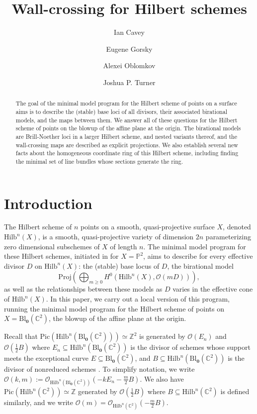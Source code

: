 \documentclass[12pt]{amsart}
\title{Wall-crossing for Hilbert schemes}
\author{Ian Cavey}
\author{Eugene Gorsky}
\author{Alexei Oblomkov}
\author{Joshua P. Turner}
\newcommand{\Hilb}{\mathrm{Hilb}}
\newcommand{\C}{\mathbb{C}}
\newcommand{\Z}{\mathbb{Z}}
\renewcommand{\P}{\mathbb{P}}
\newcommand{\CO}{\mathcal{O}}
\newcommand{\Pic}{\mathrm{Pic}}
\newcommand{\Proj}{\mathrm{Proj}}
\newcommand{\Bl}{\mathrm{Bl}}
\numberwithin{equation}{section}
\theoremstyle{definition}
\begin{document}
\maketitle

\begin{abstract}
    The goal of the minimal model program for the Hilbert scheme of points on a surface aims is to describe the (stable) base loci of all divisors, their associated birational models, and the maps between them. We answer all of these questions for the Hilbert scheme of points on the blowup of the affine plane at the origin. The birational models are Brill-Noether loci in a larger Hilbert scheme, and nested variants thereof, and the wall-crossing maps are described as explicit projections. We also establish several new facts about the homogeneous coordinate ring of this Hilbert scheme, including finding the minimal set of line bundles whose sections generate the ring.
\end{abstract}

\section{Introduction}

The Hilbert scheme of $n$ points on a smooth, quasi-projective surface $X$, denoted $\Hilb^n(X)$, is a smooth, quasi-projective variety of dimension $2n$ parameterizing zero dimensional subschemes of $X$ of length $n$. The minimal model program for these Hilbert schemes, initiated in \cite{ABCH} for $X=\P^2$, aims to describe for every effective divisor $D$ on $\Hilb^n(X)$: the (stable) base locus of $D$, the birational model
\begin{equation} 
\Proj\left(\bigoplus_{m\geq 0} H^0(\Hilb^n(X),\CO(mD))\right),
\end{equation}
as well as the relationships between these models as $D$ varies in the effective cone of $\Hilb^n(X)$. In this paper, we carry out a local version of this program, running the minimal model program for the Hilbert scheme of points on $X=\Bl_\mathbf{0}(\C^2)$, the blowup of the affine plane at the origin. 


Recall that $\Pic(\Hilb^n(\Bl_{\mathbf{0}}(\C^2)))\simeq \Z^2$ is generated by $\CO(E_n)$ and $\CO(\frac{1}{2}B)$ where $E_n\subseteq \Hilb^n(\Bl_{\mathbf{0}}(\C^2))$ is the divisor of schemes whose support meets the exceptional curve $E\subseteq \Bl_{\mathbf{0}}(\C^2)$, and $B\subseteq \Hilb^n(\Bl_{\mathbf{0}}(\C^2))$ is the divisor of nonreduced schemes \cite{Fogarty2}. To simplify notation, we write $\CO(k,m) := \CO_{\Hilb^n(\Bl_{\mathbf{0}}(\C^2))}(-kE_n-\frac{m}{2} B)$. We also have $\Pic(\Hilb^n(\C^2))\simeq \Z$ generated by $\CO(\frac{1}{2}B)$ where $B\subseteq \Hilb^n(\C^2)$ is defined similarly, and we write $\CO(m) = \CO_{\Hilb^n(\C^2)}(-\frac{m}{2}B)$.
\end{document}
